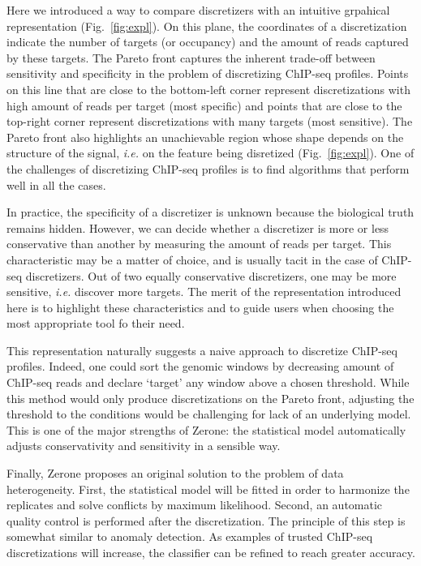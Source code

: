 \documentclass{bioinfo}
\begin{document}
Here we introduced a way to compare discretizers with an intuitive
grpahical representation (Fig.~\ref{fig:expl}). On this plane,
the coordinates of a discretization indicate the number of targets
(or occupancy) and the amount of reads captured by these targets.
The Pareto front captures the inherent trade-off between sensitivity
and specificity in the problem of discretizing ChIP-seq profiles.
Points on this line that are close to the bottom-left corner represent
discretizations with high amount of reads per target (most specific)
and points that are close to the top-right corner represent
discretizations with many targets (most sensitive). The Pareto front
also highlights an unachievable region whose shape depends on the
structure of the signal, \textit{i.e.} on the feature being disretized
(Fig.~\ref{fig:expl}). One of the challenges of discretizing ChIP-seq
profiles is to find algorithms that perform well in all the cases.

In practice, the specificity of a discretizer is unknown because
the biological truth remains hidden. However, we can decide whether
a discretizer is more or less conservative than another by measuring
the amount of reads per target. This characteristic may be a matter of
choice, and is usually tacit in the case of ChIP-seq discretizers.
Out of two equally conservative discretizers, one may be more sensitive,
\textit{i.e.} discover more targets. The merit of the representation
introduced here is to highlight these characteristics and to guide users
when choosing the most appropriate tool fo their need.

This representation naturally suggests a naive approach to discretize
ChIP-seq profiles. Indeed, one could sort the genomic windows by
decreasing amount of ChIP-seq reads and declare `target' any window
above a chosen threshold. While this method would only produce
discretizations on the Pareto front, adjusting the threshold to the
conditions would be challenging for lack of an underlying model.
This is one of the major strengths of Zerone: the statistical model
automatically adjusts conservativity and sensitivity in a sensible way.

Finally, Zerone proposes an original solution to the problem of
data heterogeneity. First, the statistical model will be fitted
in order to harmonize the replicates and solve conflicts by maximum
likelihood. Second, an automatic quality control is performed
after the discretization. The principle of this step is somewhat
similar to anomaly detection. As examples of trusted ChIP-seq
discretizations will increase, the classifier can be refined to
reach greater accuracy.
\end{document}

